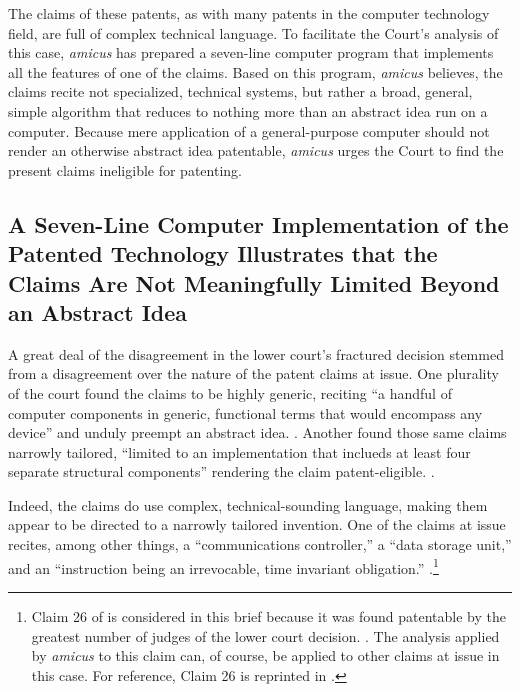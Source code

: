 \documentclass{scotus}
\def\numlines{seven\xspace}
\def\Numlines{Seven\xspace}
\def\amicus{\emph{amicus}\xspace}
\begin{document}
The claims of these patents, as with many patents in the computer technology
field, are full of complex technical language. To facilitate the Court's
analysis of this case, \amicus has prepared a \numlines-line computer program
that implements all the features of one of the claims. Based on this program,
\amicus believes, the claims recite not specialized, technical systems, but
rather a broad, general, simple algorithm that reduces to nothing more than an
abstract idea run on a computer. Because mere application of a general-purpose
computer should not render an otherwise abstract idea patentable, \amicus
urges the Court to find the present claims ineligible for patenting.

\subsection{A \Numlines-Line Computer Implementation of the Patented Technology
Illustrates that the Claims Are Not Meaningfully Limited Beyond an Abstract
Idea}

A great deal of the disagreement in the lower court's fractured decision stemmed
from a disagreement over the nature of the patent claims at issue. One plurality
of the court found the claims to be highly generic, reciting ``a handful of
computer components in generic, functional terms that would encompass any
device'' and unduly preempt an abstract idea. . Another found those same claims narrowly tailored,
``limited to an implementation that inclueds at least four separate structural
components'' rendering the claim patent-eligible. .

Indeed, the claims do use complex, technical-sounding language, making them
appear to be directed to a narrowly tailored invention. One of the claims at
issue recites, among other things, a ``communications controller,'' a
``data storage unit,'' and an ``instruction being an irrevocable, time invariant
obligation.'' .\footnote{Claim 26 of
 is considered in this brief because it was found patentable by
the greatest number of judges of the lower court decision. . The analysis applied by \amicus to this claim can, of
course, be applied to other claims at issue in this case. For reference, Claim
26 is reprinted in .}
\end{document}
